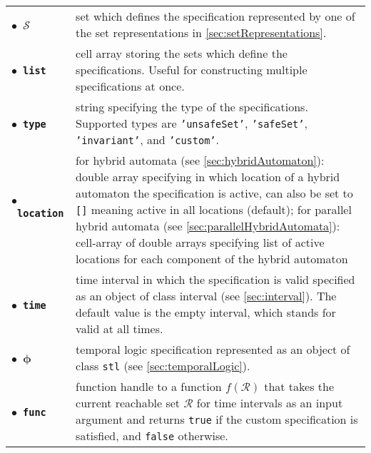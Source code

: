 \begin{center}
\renewcommand{\arraystretch}{1.3}
\begin{tabular}[t]{l p{13cm} }
	$\bullet$~$\mathbf{\mathcal{S}}$ & set which defines the specification represented by one of the set representations in \cref{sec:setRepresentations}. \\
	$\bullet$~\textbf{\texttt{list}} & cell array storing the sets which define the specifications. Useful for constructing multiple specifications at once.\\
	$\bullet$~\textbf{\texttt{type}} & string specifying the type of the specifications. Supported types are \texttt{'unsafeSet'}, \texttt{'safeSet'}, \texttt{'invariant'}, and \texttt{'custom'}. \\
	$\bullet$~\textbf{\texttt{location}} & for hybrid automata (see \cref{sec:hybridAutomaton}): double array specifying in which location of a hybrid automaton the specification is active, can also be set to \texttt{[]} meaning active in all locations (default); for parallel hybrid automata (see \cref{sec:parallelHybridAutomata}): cell-array of double arrays specifying list of active locations for each component of the hybrid automaton \\
	$\bullet$~\textbf{\texttt{time}} & time interval in which the specification is valid specified as an object of class interval (see \cref{sec:interval}). The default value is the empty interval, which stands for valid at all times. \\
	$\bullet$~$\mathbf{\phi}$ & temporal logic specification represented as an object of class \texttt{stl} (see \cref{sec:temporalLogic}). \\
	$\bullet$~\textbf{\texttt{func}} & function handle to a function $f(\mathcal{R})$ that takes the current reachable set $\mathcal{R}$ for time intervals as an input argument and returns \texttt{true} if the custom specification is satisfied, and \texttt{false} otherwise.
\end{tabular}
\end{center}

